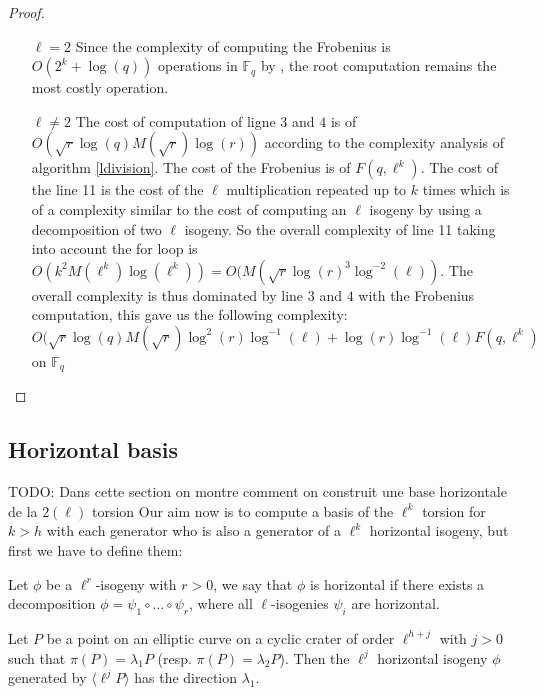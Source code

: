 \documentclass{lms}
\newcommand{\todo}[1]{{\color{red}TODO: #1}}
\begin{document}
\begin{proof}
\begin{enumerate}
\item[$\ell=2$]
Since the complexity of computing the Frobenius is $O(2^k+\log(q))$ operations in $\mathbb{F}_q$ by \cite{DBLP:journals/dcc/DoliskaniS15}, the root computation remains the most costly operation.
\item[$\ell \neq 2$] The cost of computation of ligne $3$ and $4$ is of $O(\sqrt{r} \log(q) M(\sqrt{r})\log(r))$ according to the complexity analysis of algorithm \ref{ldivision}. The cost of the Frobenius is of $F(q,\ell^k)$. The cost of the line 11 is the cost of the $\ell$ multiplication repeated up to $k$ times which is of a complexity similar to the cost of computing an $\ell$ isogeny by using a decomposition of two $\ell$ isogeny. So the overall complexity of line 11 taking into account the for loop is $O(k^2M(\ell^k)\log(\ell^k))=O(M(\sqrt{r}\log(r)^3\log^{-2}(\ell))$. The overall complexity is thus dominated by line $3$ and $4$ with the Frobenius computation, this gave us the following complexity: $O(\sqrt{r} \log(q) M(\sqrt{r})\log^2(r)\log^{-1}(\ell)+ \log(r)\log^{-1}(\ell) F(q,\ell^k)$ on $\mathbb{F}_q$
\end{enumerate}
\end{proof}



\subsection{Horizontal basis}
\todo{Dans cette section on montre comment on construit une base horizontale de la $2(\ell)$ torsion}
Our aim now is to compute  a basis of the $\ell^k$ torsion for $k>h$ with each generator who is also a generator of a $\ell^{k}$ horizontal isogeny, but first we have to define them:

\begin{defi}%
Let $\phi$ be a $\ell^r$-isogeny with $r>0$, we say that $\phi$ is horizontal  if there exists a decomposition $\phi = \psi_1 \circ … \circ \psi_r$, where all $\ell$-isogenies $\psi_i$ are horizontal.
\end{defi}

\begin{defi}
Let $P$ be a point on an elliptic curve on a cyclic crater of order $\ell^{h+j}$ with $j>0$ such that $\pi(P)=\lambda_1P$ (resp. $\pi(P)=\lambda_2P$). Then the $\ell^j$ horizontal isogeny $\phi$ generated by $\langle \ell^{j}P \rangle$ has the direction $\lambda_1$.
\end{defi}
\end{document}
